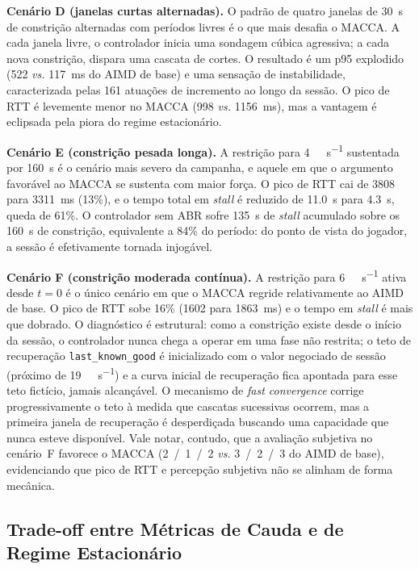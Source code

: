 \documentclass[conference]{IEEEtran}
\begin{document}
\textbf{Cenário D (janelas curtas alternadas).} O padrão de
quatro janelas de \SI{30}{\second} de constrição alternadas
com períodos livres é o que mais desafia o MACCA. A cada
janela livre, o controlador inicia uma sondagem cúbica
agressiva; a cada nova constrição, dispara uma cascata de
cortes. O resultado é um p95 explodido (522 \emph{vs.} 117~ms
do AIMD de base) e uma sensação de instabilidade,
caracterizada pelas 161 atuações de incremento ao longo da
sessão. O pico de RTT é levemente menor no MACCA (998
\emph{vs.} 1156~ms), mas a vantagem é eclipsada pela piora
do regime estacionário.

\textbf{Cenário E (constrição pesada longa).} A restrição
para \SI{4}{\mega\bit\per\second} sustentada por
\SI{160}{\second} é o cenário mais severo da campanha, e
aquele em que o argumento favorável ao MACCA se
sustenta com maior força. O pico de RTT cai de 3808 para
3311~ms (13\%), e o tempo total em \emph{stall} é reduzido de
\SI{11.0}{\second} para \SI{4.3}{\second}, queda de 61\%. O
controlador sem ABR sofre \SI{135}{\second} de \emph{stall}
acumulado sobre os \SI{160}{\second} de constrição, equivalente
a 84\% do período: do ponto de vista do jogador, a sessão é
efetivamente tornada injogável.

\textbf{Cenário F (constrição moderada contínua).} A
restrição para \SI{6}{\mega\bit\per\second} ativa desde
$t=0$ é o único cenário em que o MACCA regride
relativamente ao AIMD de base. O pico de RTT sobe 16\%
(1602 para 1863~ms) e o tempo em \emph{stall} é mais que
dobrado. O diagnóstico é estrutural: como a constrição existe
desde o início da sessão, o controlador nunca chega a operar
em uma fase não restrita; o teto de recuperação
\texttt{last\_known\_good} é inicializado com o valor
negociado de sessão (próximo de \SI{19}{\mega\bit\per\second})
e a curva inicial de recuperação fica apontada para esse teto
fictício, jamais alcançável. O mecanismo de \emph{fast
convergence} corrige progressivamente o teto à medida que
cascatas sucessivas ocorrem, mas a primeira janela de
recuperação é desperdiçada buscando uma capacidade que nunca
esteve disponível. Vale notar, contudo, que a avaliação
subjetiva no cenário~F favorece o MACCA (2~/~1~/~2
\emph{vs.} 3~/~2~/~3 do AIMD de base), evidenciando que pico
de RTT e percepção subjetiva não se alinham de forma
mecânica.

\subsection{Trade-off entre Métricas de Cauda e de Regime Estacionário}
\end{document}
